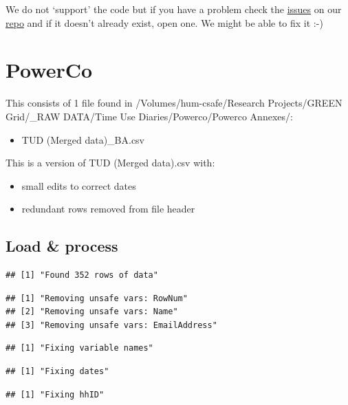\documentclass[]{article}
\providecommand{\tightlist}{%
  \setlength{\itemsep}{0pt}\setlength{\parskip}{0pt}}
\begin{document}
We do not `support' the code but if you have a problem check the
\href{https://git.soton.ac.uk/ba1e12/nzGREENGrid/issues}{issues} on our
\href{https://git.soton.ac.uk/ba1e12/nzGREENGrid}{repo} and if it
doesn't already exist, open one. We might be able to fix it :-)

\section{PowerCo}\label{powerco}

This consists of 1 file found in /Volumes/hum-csafe/Research
Projects/GREEN Grid/\_RAW DATA/Time Use Diaries/Powerco/Powerco
Annexes/:

\begin{itemize}
\tightlist
\item
  TUD (Merged data)\_BA.csv
\end{itemize}

This is a version of TUD (Merged data).csv with:

\begin{itemize}
\tightlist
\item
  small edits to correct dates
\item
  redundant rows removed from file header
\end{itemize}

\subsection{Load \& process}\label{load-process}

\begin{verbatim}
## [1] "Found 352 rows of data"
\end{verbatim}

\begin{verbatim}
## [1] "Removing unsafe vars: RowNum"      
## [2] "Removing unsafe vars: Name"        
## [3] "Removing unsafe vars: EmailAddress"
\end{verbatim}

\begin{verbatim}
## [1] "Fixing variable names"
\end{verbatim}

\begin{verbatim}
## [1] "Fixing dates"
\end{verbatim}

\begin{verbatim}
## [1] "Fixing hhID"
\end{verbatim}
\end{document}
